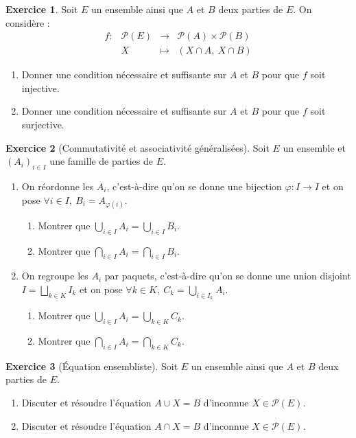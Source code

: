 \documentclass[french]{book}
\theoremstyle{definition}
\newtheorem{ex}{Exercice}[chapter]
\theoremstyle{theorem}
\theoremstyle{remark}
\begin{document}
\begin{ex}
	Soit $E$ un ensemble ainsi que $A$ et $B$ deux parties de $E$. On considère : $$\begin{array}{lrcl}
		f:&\mathcal{P}(E)&\longrightarrow&\mathcal{P}(A)\times\mathcal{P}(B)\\
		&X&\longmapsto&(X\cap A,\ X\cap B)
	\end{array}$$
	\begin{enumerate}
		\item Donner une condition nécessaire et suffisante sur $A$ et $B$ pour que $f$ soit injective.
		\item Donner une condition nécessaire et suffisante sur $A$ et $B$ pour que $f$ soit surjective.
	\end{enumerate}
\end{ex}

\begin{ex}[Commutativité et associativité généralisées]
	Soit $E$ un ensemble et $(A_i)_{i\in I}$ une famille de parties de $E$.
	\begin{enumerate}
		\item On réordonne les $A_i$, c'est-à-dire qu'on se donne une bijection $\varphi:I\to I$ et on pose $\forall i\in I,\ B_i=A_{\varphi(i)}$.
		\begin{enumerate}[label=\alph*.]
			\item Montrer que $\displaystyle\bigcup_{i\in I}A_i=\bigcup_{i\in I} B_i$.
			\item Montrer que $\displaystyle\bigcap_{i\in I}A_i=\bigcap_{i\in I} B_i$.
		\end{enumerate}
		\item On regroupe les $A_i$ par paquets, c'est-à-dire qu'on se donne une union disjoint $\displaystyle I=\bigsqcup_{k\in K}I_k$ et on pose $\forall k\in K,\ C_k=\displaystyle\bigcup_{i\in I_k} A_i$.
		\begin{enumerate}[label=\alph*.]
			\item Montrer que $\displaystyle\bigcup_{i\in I}A_i=\bigcup_{k\in K} C_k$.
			\item Montrer que $\displaystyle\bigcap_{i\in I}A_i=\bigcap_{k\in K} C_k$.
		\end{enumerate}
	\end{enumerate}
\end{ex}

\begin{ex}[Équation ensembliste]
	Soit $E$ un ensemble ainsi que $A$ et $B$ deux parties de $E$.
	\begin{enumerate}
		\item Discuter et résoudre l'équation $A\cup X=B$ d'inconnue $X\in\mathcal{P}(E)$.
		\item Discuter et résoudre l'équation $A\cap X=B$ d'inconnue $X\in\mathcal{P}(E)$.
	\end{enumerate}
\end{ex}
\end{document}
